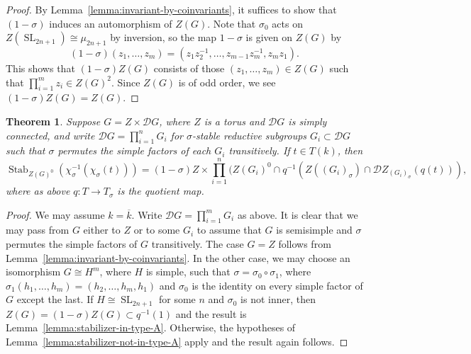 \documentclass[11pt,reqno]{amsart}
\newtheorem{theorem}{Theorem}[section]
\newtheorem{cor}[theorem]{Corollary}
\theoremstyle{definition}
\renewcommand{\rm}{\mathrm}
\newcommand{\sD}{{\mathscr D}}
\DeclareMathOperator{\SL}{SL}
\DeclareMathOperator{\Stab}{Stab}
\newcommand{\ov}[1]{\overline{#1}}
\begin{document}
\begin{proof}
    By Lemma~\ref{lemma:invariant-by-coinvariants}, it suffices to show that $(1-\sigma)$ induces an automorphism of $Z(G)$. Note that $\sigma_0$ acts on $Z(\SL_{2n+1}) \cong \mu_{2n+1}$ by inversion, so the map $1 - \sigma$ is given on $Z(G)$ by
    \[
    (1 - \sigma)(z_1, \dots, z_m) = (z_1 z_2^{-1}, \dots, z_{m-1} z_m^{-1}, z_m z_1).
    \]
    This shows that $(1-\sigma)Z(G)$ consists of those $(z_1, \dots, z_m) \in Z(G)$ such that $\prod_{i=1}^m z_i \in Z(G)^2$. Since $Z(G)$ is of odd order, we see $(1-\sigma)Z(G) = Z(G)$.
\end{proof}

\begin{theorem}\label{theorem:torsor-identification}
    Suppose $G = Z \times \sD G$, where $Z$ is a torus and $\sD G$ is simply connected, and write $\sD G = \prod_{i=1}^n G_i$ for $\sigma$-stable reductive subgroups $G_i \subset \sD G$ such that $\sigma$ permutes the simple factors of each $G_i$ transitively. If $t \in T(k)$, then 
    \[
    \Stab_{Z(G)^0}(\chi_\sigma^{-1}(\chi_\sigma(t))) = (1-\sigma)Z \times \prod_{i=1}^n (Z(G_i)^0 \cap q^{-1}(Z((G_i)_\sigma) \cap \sD Z_{(G_i)_\sigma}(q(t))),
    \]
    where as above $q\colon T \to T_\sigma$ is the quotient map.
\end{theorem}

\begin{proof}
    We may assume $k = \ov{k}$. Write $\sD G = \prod_{i=1}^m G_i$ as above. It is clear that we may pass from $G$ either to $Z$ or to some $G_i$ to assume that $G$ is semisimple and $\sigma$ permutes the simple factors of $G$ transitively. The case $G = Z$ follows from Lemma~\ref{lemma:invariant-by-coinvariants}. In the other case, we may choose an isomorphism $G \cong H^m$, where $H$ is simple, such that $\sigma = \sigma_0 \circ \sigma_1$, where $\sigma_1(h_1, \dots, h_m) = (h_2, \dots, h_m, h_1)$ and $\sigma_0$ is the identity on every simple factor of $G$ except the last. If $H \cong \SL_{2n+1}$ for some $n$ and $\sigma_0$ is not inner, then $Z(G) = (1-\sigma)Z(G) \subset q^{-1}(1)$ and the result is Lemma~\ref{lemma:stabilizer-in-type-A}. Otherwise, the hypotheses of Lemma~\ref{lemma:stabilizer-not-in-type-A} apply and the result again follows.
\end{proof}

\end{document}
